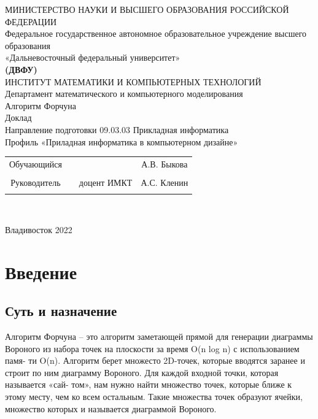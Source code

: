 \documentclass[12 pt, a4paper]{article}
\begin{document}
\begin{center}
\hfill \break
\large{МИНИСТЕРСТВО НАУКИ И ВЫСШЕГО ОБРАЗОВАНИЯ РОССИЙСКОЙ ФЕДЕРАЦИИ}\\
\footnotesize{Федеральное государственное автономное образовательное учреждение высшего образования}\\ 
\footnotesize{«Дальневосточный федеральный университет»}\\
\small{\textbf{(ДВФУ)}}\\
\hfill \break
\normalsize{ИНСТИТУТ МАТЕМАТИКИ И КОМПЬЮТЕРНЫХ ТЕХНОЛОГИЙ}\\
 \hfill \break
\normalsize{Департамент математического и компьютерного моделирования}\\
\hfill\break
\hfill \break
\hfill \break
\hfill \break
\large{Алгоритм Форчуна}\\
\hfill \break
\hfill \break
\hfill \break
\normalsize{Доклад\\
\hfill \break
Направление подготовки 09.03.03 Прикладная информатика\\
\hfill \break
Профиль «Приладная информатика в компьютерном дизайне»}\\
\hfill \break
\hfill \break
\end{center}
 
\normalsize{} \hfill \break
\hfill \break
 
\normalsize{ 
\begin{tabular}{cccc}
Обучающийся & \underline{\hspace{3cm}} & &А.В. Быкова \\\\
Руководитель & \underline{\hspace{3cm}}& доцент ИМКТ &А.С. Кленин \\\\
\end{tabular}
}\\
\hfill \break
\hfill \break
\begin{center} Владивосток 2022 \end{center}
\thispagestyle{empty} 
 
\newpage
     
    \tableofcontents 
\newpage

\section{Введение}
\subsection{Суть и назначение}
Алгоритм Форчуна – это алгоритм заметающей прямой для генерации диаграммы
Вороного из набора точек на плоскости за время O(n log n) с использованием памя-
ти O(n). Алгоритм берет множесто 2D-точек, которые вводятся заранее и строит по
ним диаграмму Вороного. Для каждой входной точки, которая называется «сай-
том», нам нужно найти множество точек, которые ближе к этому месту, чем ко
всем остальным. Такие множества точек образуют ячейки, множество которых и
называется диаграммой Вороного.
\end{document}
